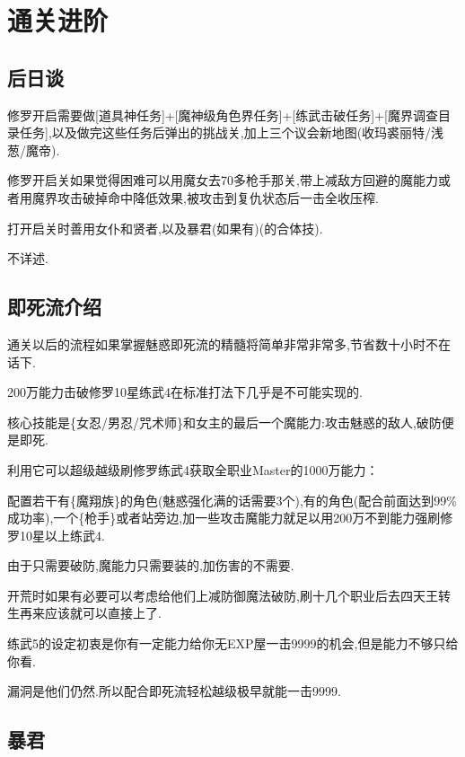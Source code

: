 \newpage

\section{通关进阶}


	\subsection{后日谈}

	修罗开启需要做[道具神任务]+[魔神级角色界任务]+[练武击破任务]+[魔界调查目录任务],以及做完这些任务后弹出的挑战关,加上三个议会新地图(收玛裘丽特/浅葱/魔帝).

	修罗开启关如果觉得困难可以用魔女去70多枪手那关,带上减敌方回避的魔能力或者用魔界攻击破掉命中降低效果,被攻击到复仇状态后一击全收压榨.

	打开启关时善用女仆和贤者,以及暴君(如果有)(的合体技).

	不详述.

	\subsection{即死流介绍}

	通关以后的流程如果掌握魅惑即死流的精髓将简单非常非常多,节省数十小时不在话下.

	200万能力击破修罗10星练武4在标准打法下几乎是不可能实现的.

	核心技能是{\color{red}{魅惑魔法}}\{女忍/男忍/咒术师\}和女主的最后一个魔能力{\color{red}{生杀予夺}}:攻击魅惑的敌人,破防便是即死.

	利用它可以超级越级刷修罗练武4获取全职业Master的1000万能力：

	配置若干有{\color{red}{瘴气蔓延}}\{魔翔族\}的角色(魅惑强化满的话需要3个),有{\color{red}{强化9/范围9/魅惑}}的角色(配合前面达到99\%成功率),一个{\color{red}{辅助}}\{枪手\}或者{\color{red}{克里斯多}}站旁边,加一些攻击魔能力就足以用200万不到能力强刷修罗10星以上练武4.

	由于只需要破防,魔能力只需要装{\color{red}{加数值加攻击}}的,加伤害的不需要.

	开荒时如果有必要可以考虑给他们上减防御魔法破防,刷十几个职业后去四天王转生再来应该就可以直接上了.

	练武5的设定初衷是你有一定能力给你无EXP屋一击9999的机会,但是能力不够只给你看.

	漏洞是他们仍然{\color{red}{吃即死}}.所以配合即死流轻松越级极早就能一击9999.

	\subsection{暴君}

